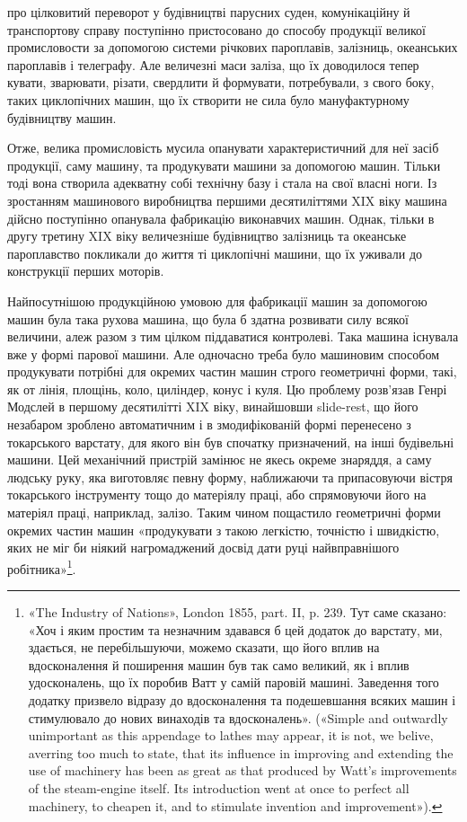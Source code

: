 \parcont{}  %
про цілковитий переворот у будівництві парусних суден, комунікаційну
й транспортову справу поступінно пристосовано до способу
продукції великої промисловости за допомогою системи річкових
пароплавів, залізниць, океанських пароплавів і телеграфу.
Але величезні маси заліза, що їх доводилося тепер кувати, зварювати,
різати, свердлити й формувати, потребували, з свого боку,
таких циклопічних машин, що їх створити не сила було мануфактурному
будівництву машин.

Отже, велика промисловість мусила опанувати характеристичний
для неї засіб продукції, саму машину, та продукувати машини
за допомогою машин. Тільки тоді вона створила адекватну собі
технічну базу і стала на свої власні ноги. Із зростанням машинового
виробництва першими десятиліттями XIX віку машина дійсно
поступінно опанувала фабрикацію виконавчих машин. Однак,
тільки в другу третину XIX віку величезніше будівництво
залізниць та океанське пароплавство покликали до життя ті
циклопічні машини, що їх уживали до конструкції перших
моторів.

Найпосутнішою продукційною умовою для фабрикації машин
за допомогою машин була така рухова машина, що була б здатна
розвивати силу всякої величини, алеж разом з тим цілком піддаватися
контролеві. Така машина існувала вже у формі парової
машини. Але одночасно треба було машиновим способом продукувати
потрібні для окремих частин машин строго геометричні
форми, такі, як от лінія, площінь, коло, циліндер, конус і куля.
Цю проблему розв’язав Генрі Модслей в першому десятилітті
XIX віку, винайшовши slide-rest, що його незабаром зроблено
автоматичним і в змодифікованій формі перенесено з токарського
варстату, для якого він був спочатку призначений, на інші будівельні
машини. Цей механічний пристрій замінює не якесь окреме
знаряддя, а саму людську руку, яка виготовляє певну форму, наближаючи
та припасовуючи вістря токарського інструменту тощо
до матеріялу праці, або спрямовуючи його на матеріял праці,
наприклад, залізо. Таким чином пощастило геометричні форми
окремих частин машин «продукувати з такою легкістю, точністю
і швидкістю, яких не міг би ніякий нагромаджений досвід дати
руці найвправнішого робітника»\footnote{
«The Industry of Nations», London 1855, part. II, p. 239. Тут
саме сказано: «Хоч і яким простим та незначним здавався б цей додаток
до варстату, ми, здається, не перебільшуючи, можемо сказати, що його
вплив на вдосконалення й поширення машин був так само великий, як і
вплив удосконалень, що їх поробив Ватт у самій паровій машині. Заведення
того додатку призвело відразу до вдосконалення та подешевшання
всяких машин і стимулювало до нових винаходів та вдосконалень».
(«Simple and outwardly unimportant as this appendage to lathes may appear,
it is not, we belive, averring too much to state, that its influence in
improving and extending the use of machinery has been as great as that
produced by Watt’s improvements of the steam-engine itself. Its introduction
went at once to perfect all machinery, to cheapen it, and to stimulate
invention and improvement»).
}.
